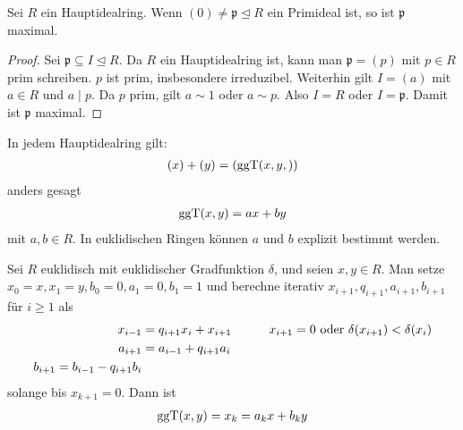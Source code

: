 \begin{proposition}
	Sei $R$ ein Hauptidealring. Wenn $(0) \neq \mathfrak{p} \unlhd R$ ein Primideal ist, so ist $\mathfrak{p}$ maximal.
\end{proposition}

\begin{proof}
	Sei $\mathfrak{p} \subseteq I \unlhd R$. Da $R$ ein Hauptidealring ist, kann man $\mathfrak{p} = (p)$ mit $p \in R$ prim schreiben. $p$ ist prim, insbesondere irreduzibel. Weiterhin gilt $I = (a)$ mit $a \in R$ und $a \mid p$. Da $p$ prim, gilt $a \sim 1$ oder $a \sim p$. Also $I = R$ oder $I = \mathfrak{p}$. Damit ist $\mathfrak{p}$ maximal.
\end{proof}

\begin{remark}
	In jedem Hauptidealring gilt:
	\begin{align}
		(x) + (y) = (\operatorname{ggT}(x,y,)) \notag
	\end{align}
	anders gesagt
	\begin{align}
		\operatorname{ggT}(x,y) = ax + by \notag
	\end{align}
	mit $a,b \in R$. In euklidischen Ringen können $a$ und $b$ explizit bestimmt werden.
\end{remark}

\begin{proposition}
	Sei $R$ euklidisch mit euklidischer Gradfunktion $\delta$, und seien $x,y \in R$. Man setze $x_0 = x, x_1 = y, b_0 = 0, a_1 = 0, b_1 = 1$ und berechne iterativ $x_{i+1}, q_{i+1}, a_{i+1}, b_{i+1}$ für $i \ge 1$ als
	\begin{align}
		x_{i-1} &= q_{i+1}x_i + x_{i+1} &\qquad &x_{i+1} = 0 \text{ oder } \delta(x_{i+1}) < \delta(x_i) \notag \\
		a_{i+1} &= a_{i-1} + q_{i+1}a_i & & \notag \\
		b_{i+1} = b_{i-1} - q_{i+1}b_i & & \notag
	\end{align}
	solange bis $x_{k+1} = 0$. Dann ist
	\begin{align}
		\operatorname{ggT}(x,y) = x_k = a_k x + b_k y \notag
	\end{align}
\end{proposition}

